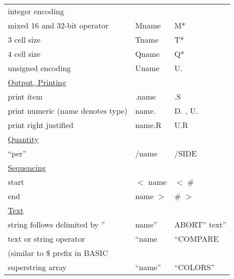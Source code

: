 \begin{longtable}{lll}
integer encoding\\
mixed 16 and 32-bit operator&Mname&M*\\
3 cell size&Tname&T*\\
4 cell size&Qname&Q*\\
unsigned encoding&Uname&U.\\[1ex]
\underline{Output, Printing}\\
print item&.name&.S\\
print numeric (name denotes type)&name.&D. , U.\\
print right justified&name.R&U.R\\[1ex]
\underline{Quantity}\\
``per''&/name&/SIDE\\[1ex]
\underline{Sequencing}\\
start&\(<\) name&\(<\) \#\\
end&name \(>\)&\# \(>\)\\[1ex]
\underline{Text}\\
string follows delimited by ''&name''&ABORT'' text''\\
text or string operator&``name&``COMPARE\\
(similar to \$ prefix in BASIC\\
superstring array&``name''&``COLORS''\\
\end{longtable}

